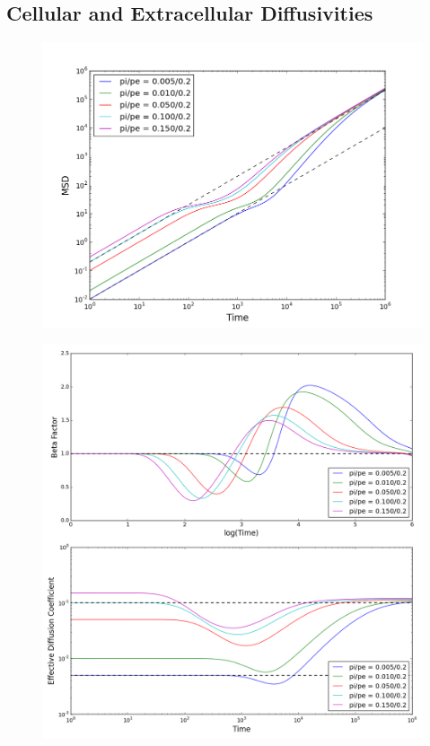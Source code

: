 \subsection{Cellular and Extracellular Diffusivities}
\label{sec:2D-cellular-extracellular-diffusivities}	
	\begin{figure}[h]
		\centering
		\includegraphics[width=1.0\linewidth]{../images/2D/pipe_msd_2D}
		\caption{}
		\label{fig:pipe_msd_2D}
	\end{figure}
	
	\begin{figure}[h]
		\centering
		\includegraphics[width=1.0\linewidth]{../images/2D/pipe_beta_deff_2D}
		\caption{}
		\label{fig:pipe_beta_deff_2D}
	\end{figure}
	
